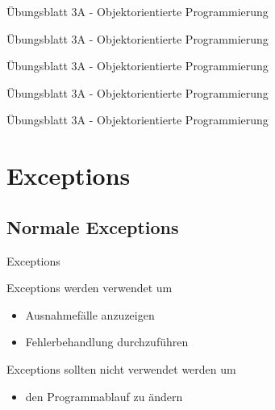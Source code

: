 \documentclass[18pt]{beamer}
\begin{document}
\begin{frame}[fragile]{Übungsblatt 3A - Objektorientierte Programmierung}
 \begin{multicols}{2}
 
 \end{multicols}

\end{frame}

\begin{frame}[fragile]{Übungsblatt 3A - Objektorientierte Programmierung}
 \begin{multicols}{2}
 
 \end{multicols}

\end{frame}

\begin{frame}[fragile]{Übungsblatt 3A - Objektorientierte Programmierung}
 

\end{frame}

\begin{frame}[fragile]{Übungsblatt 3A - Objektorientierte Programmierung}
 \begin{multicols}{2}
 
 \end{multicols}

\end{frame}

\begin{frame}[fragile]{Übungsblatt 3A - Objektorientierte Programmierung}
 \begin{multicols}{2}
 
 \end{multicols}

\end{frame}

\section{Exceptions}

\subsection{Normale Exceptions}
\begin{frame}{Exceptions}

Exceptions werden verwendet um
\begin{itemize}
 \item Ausnahmefälle anzuzeigen
 \item Fehlerbehandlung durchzuführen
\end{itemize}

Exceptions sollten nicht verwendet werden um
\begin{itemize}
 \item den Programmablauf zu ändern
\end{itemize}
 
\end{frame}
\end{document}
